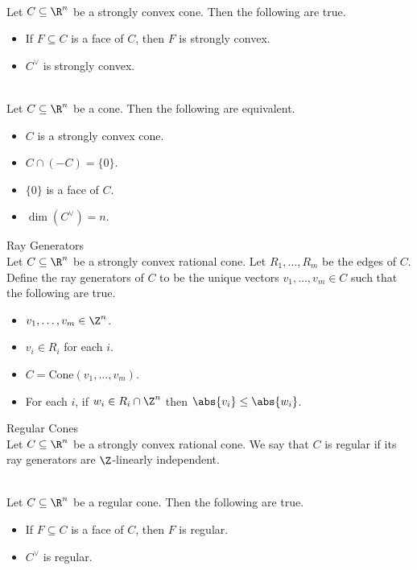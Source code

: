 \documentclass[a4paper]{article}
\begin{document}
\begin{lmm}{}{}\\
Let $C\subseteq\R^n$ be a strongly convex cone. Then the following are true. 
\begin{itemize}
\item If $F\subseteq C$ is a face of $C$, then $F$ is strongly convex. 
\item $C^\vee$ is strongly convex. 
\end{itemize}
\end{lmm}

\begin{prp}{}{}\\
Let $C\subseteq\R^n$ be a cone. Then the following are equivalent. 
\begin{itemize}
\item $C$ is a strongly convex cone. 
\item $C\cap(-C)=\{0\}$. 
\item $\{0\}$ is a face of $C$. 
\item $\dim(C^\vee)=n$. 
\end{itemize}
\end{prp}

\begin{defn}{Ray Generators}{}\\
Let $C\subseteq\R^n$ be a strongly convex rational cone. Let $R_1,\dots,R_m$ be the edges of $C$. Define the ray generators of $C$ to be the unique vectors $v_1,\dots,v_m\in C$ such that the following are true. 
\begin{itemize}
\item $v_1,\dots,v_m\in\Z^n$. 
\item $v_i\in R_i$ for each $i$. 
\item $C=\text{Cone}(v_1,\dots,v_m)$. 
\item For each $i$, if $w_i\in R_i\cap\Z^n$ then $\abs{v_i}\leq\abs{w_i}$. 
\end{itemize}
\end{defn}

\begin{defn}{Regular Cones}{}\\
Let $C\subseteq\R^n$ be a strongly convex rational cone. We say that $C$ is regular if its ray generators are $\Z$-linearly independent. 
\end{defn}

\begin{lmm}{}{}\\
Let $C\subseteq\R^n$ be a regular cone. Then the following are true. 
\begin{itemize}
\item If $F\subseteq C$ is a face of $C$, then $F$ is regular. 
\item $C^\vee$ is regular. 
\end{itemize}
\end{lmm}
\end{document}
